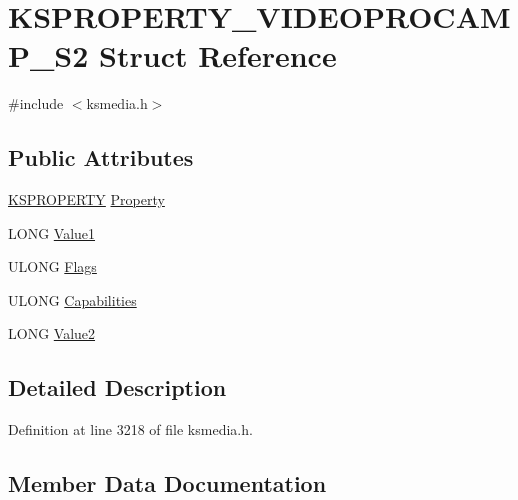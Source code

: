 \hypertarget{struct_k_s_p_r_o_p_e_r_t_y___v_i_d_e_o_p_r_o_c_a_m_p___s2}{}\section{K\+S\+P\+R\+O\+P\+E\+R\+T\+Y\+\_\+\+V\+I\+D\+E\+O\+P\+R\+O\+C\+A\+M\+P\+\_\+\+S2 Struct Reference}
\label{struct_k_s_p_r_o_p_e_r_t_y___v_i_d_e_o_p_r_o_c_a_m_p___s2}


{\ttfamily \#include $<$ksmedia.\+h$>$}

\subsection*{Public Attributes}
\begin{DoxyCompactItemize}
\item 
\hyperlink{ks_8h_a4392f77c74e868d813d46c39ada4d660}{K\+S\+P\+R\+O\+P\+E\+R\+TY} \hyperlink{struct_k_s_p_r_o_p_e_r_t_y___v_i_d_e_o_p_r_o_c_a_m_p___s2_a831273d85d971e599ee86b7e068ba804}{Property}
\item 
L\+O\+NG \hyperlink{struct_k_s_p_r_o_p_e_r_t_y___v_i_d_e_o_p_r_o_c_a_m_p___s2_a60f2292f1cfc6b7eb44bf0ebbc9c877e}{Value1}
\item 
U\+L\+O\+NG \hyperlink{struct_k_s_p_r_o_p_e_r_t_y___v_i_d_e_o_p_r_o_c_a_m_p___s2_ab653f70f0c78d4cbda9b10708728907b}{Flags}
\item 
U\+L\+O\+NG \hyperlink{struct_k_s_p_r_o_p_e_r_t_y___v_i_d_e_o_p_r_o_c_a_m_p___s2_ac11907cf52b3ed10c175333059615898}{Capabilities}
\item 
L\+O\+NG \hyperlink{struct_k_s_p_r_o_p_e_r_t_y___v_i_d_e_o_p_r_o_c_a_m_p___s2_a68eb42957cdadb559f384b7fba93c4cd}{Value2}
\end{DoxyCompactItemize}


\subsection{Detailed Description}


Definition at line 3218 of file ksmedia.\+h.



\subsection{Member Data Documentation}
